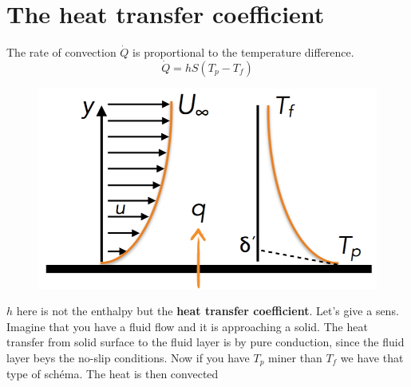 \section{The heat transfer coefficient}
	The rate of convection $\dot{Q}$ is proportional to the temperature difference. 
	\begin{equation}
		\dot{Q} = h S(T_p - T_f)
	\end{equation}		
	\begin{figure}
	\vspace{-15mm}
	\includegraphics[scale=0.25]{ch5/3}
	\end{figure}	
	$h$ here is not the enthalpy but the \textbf{heat transfer coefficient}. Let’s give a sens. Imagine that you have a fluid flow and it is approaching a solid. The heat transfer from solid surface to the fluid layer is by pure conduction, since the fluid layer beys the no-slip conditions. Now if you have $T_p$ miner than $T_f$ we have that type of schéma. The heat is then convected 
 

